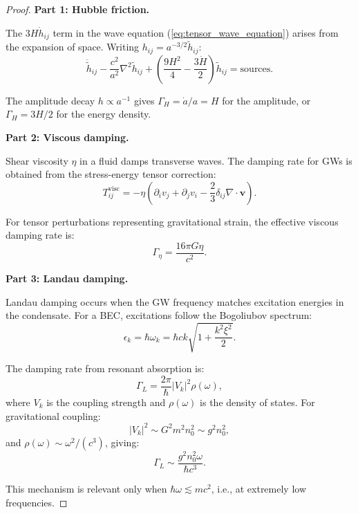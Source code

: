 \documentclass[11pt,a4paper]{article}
\theoremstyle{definition}
\theoremstyle{remark}
\begin{document}
\begin{proof}
\textbf{Part 1: Hubble friction.}

The $3H\dot{h}_{ij}$ term in the wave equation (\ref{eq:tensor_wave_equation}) arises from the expansion of space. Writing $h_{ij} = a^{-3/2}\tilde{h}_{ij}$:
\begin{equation}
\ddot{\tilde{h}}_{ij} - \frac{c^2}{a^2}\nabla^2\tilde{h}_{ij} + \left(\frac{9H^2}{4} - \frac{3\dot{H}}{2}\right)\tilde{h}_{ij} = \text{sources}.
\end{equation}

The amplitude decay $h \propto a^{-1}$ gives $\Gamma_H = \dot{a}/a = H$ for the amplitude, or $\Gamma_H = 3H/2$ for the energy density.

\textbf{Part 2: Viscous damping.}

Shear viscosity $\eta$ in a fluid damps transverse waves. The damping rate for GWs is obtained from the stress-energy tensor correction:
\begin{equation}
T_{ij}^{\mathrm{visc}} = -\eta\left(\partial_i v_j + \partial_j v_i - \frac{2}{3}\delta_{ij}\nabla\cdot\mathbf{v}\right).
\end{equation}

For tensor perturbations representing gravitational strain, the effective viscous damping rate is:
\begin{equation}
\Gamma_\eta = \frac{16\pi G\eta}{c^2}.
\end{equation}

\textbf{Part 3: Landau damping.}

Landau damping occurs when the GW frequency matches excitation energies in the condensate. For a BEC, excitations follow the Bogoliubov spectrum:
\begin{equation}
\epsilon_k = \hbar\omega_k = \hbar ck\sqrt{1 + \frac{k^2\xi^2}{2}}.
\end{equation}

The damping rate from resonant absorption is:
\begin{equation}
\Gamma_L = \frac{2\pi}{\hbar}|V_{k}|^2 \rho(\omega),
\end{equation}
where $V_k$ is the coupling strength and $\rho(\omega)$ is the density of states. For gravitational coupling:
\begin{equation}
|V_k|^2 \sim G^2 m^2 n_0^2 \sim g^2 n_0^2,
\end{equation}
and $\rho(\omega) \sim \omega^2/(c^3)$, giving:
\begin{equation}
\Gamma_L \sim \frac{g^2 n_0^2 \omega}{\hbar c^3}.
\end{equation}

This mechanism is relevant only when $\hbar\omega \lesssim mc^2$, i.e., at extremely low frequencies. \qedhere
\end{proof}
\end{document}
